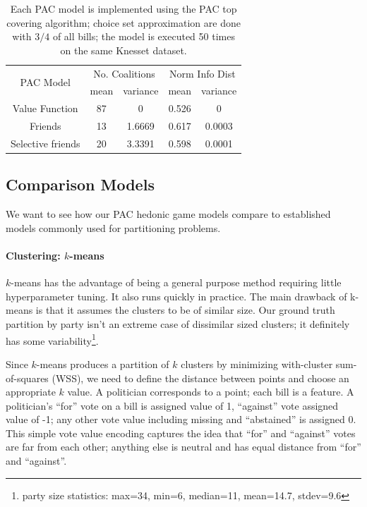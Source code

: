 \documentclass[letterpaper]{article} %
\theoremstyle{definition}
\begin{document}
\begin{table}[h!]
\centering
\begin{tabular}{c|c|c|c|c}
\hline
\multirow{2}{*}{ PAC Model } & \multicolumn{2}{c|}{ No. Coalitions } & \multicolumn{2}{|c}{ Norm Info Dist } \\
& mean & variance & mean & variance \\
\hline
Value Function & 87 & 0 & 0.526 & 0 \\
Friends & 13 & 1.6669 & 0.617 & 0.0003 \\
Selective friends & 20 & 3.3391 & 0.598 & 0.0001 \\
\hline
\end{tabular}
\caption{Each PAC model is implemented using the PAC top covering algorithm; choice set approximation are done with $3/4$ of all bills; the model is executed 50 times on the same Knesset dataset.}
\label{table:pac_models}
\end{table}

\subsection{Comparison Models} \label{subsec:exp_comparison_models}
We want to see how our PAC hedonic game models compare to established models commonly used for partitioning problems.

\paragraph{Clustering: $k$-means}
$k$-means has the advantage of being a general purpose method requiring little hyperparameter tuning. It also runs quickly in practice.
The main drawback of k-means is that it assumes the clusters to be of similar size.
Our ground truth partition by party isn't an extreme case of dissimilar sized clusters; it definitely has some variability\footnote{party size statistics: max=34, min=6, median=11, mean=14.7, stdev=9.6}.

Since $k$-means produces a partition of $k$ clusters by minimizing with-cluster sum-of-squares (WSS), we need to define the distance between points and choose an appropriate $k$ value.
A politician corresponds to a point; each bill is a feature. A politician's ``for'' vote on a bill is assigned value of 1, ``against'' vote assigned value of -1; any other vote value including missing and ``abstained'' is assigned 0.
This simple vote value encoding captures the idea that ``for'' and ``against'' votes are far from each other; anything else is neutral and has equal distance from ``for'' and ``against''.
\end{document}

